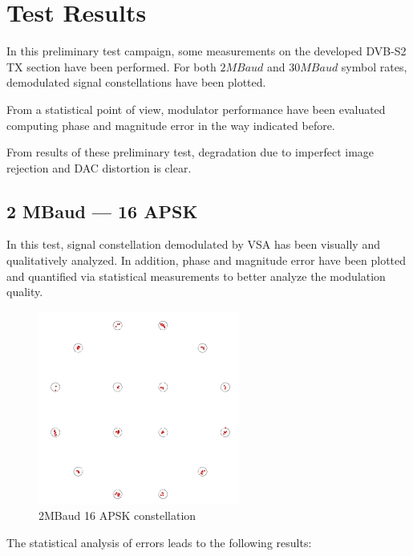 \clearpage

\section{Test Results}

In this preliminary test campaign, some measurements on the developed DVB-S2 TX section have been performed. For both \(2 \unit{MBaud}\) and \(30 \unit{MBaud}\) symbol rates, demodulated signal constellations have been plotted.

From a statistical point of view, modulator performance have been evaluated computing phase and magnitude error in the way indicated before.

From results of these preliminary test, degradation due to imperfect image rejection and DAC distortion is clear.

\subsection{2 MBaud --- 16 APSK}

In this test, signal constellation demodulated by VSA has been visually and qualitatively analyzed. In addition, phase and magnitude error have been plotted and quantified via statistical measurements to better analyze the modulation quality.

\begin{figure} \centering
\includegraphics[scale=1.2]{2MBaud16APSK2}
\caption{2MBaud 16 APSK constellation} \label{fig:16PSK2MBaud}
\end{figure}

The statistical analysis of errors leads to the following results:

